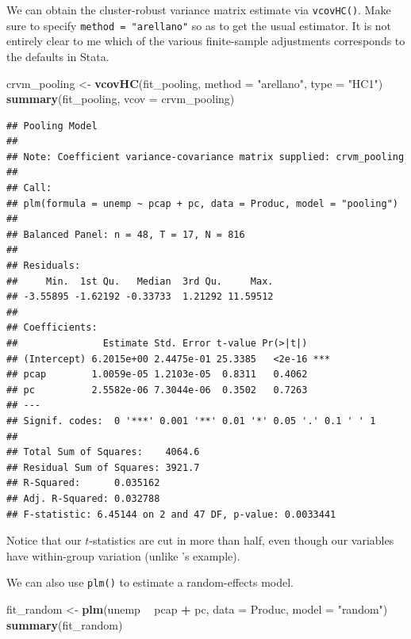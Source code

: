 \documentclass[12pt,oneside,openany]{book}
\newenvironment{Shaded}{\begin{snugshade}}{\end{snugshade}}
\newcommand{\KeywordTok}[1]{\textcolor[rgb]{0.13,0.29,0.53}{\textbf{#1}}}
\newcommand{\DataTypeTok}[1]{\textcolor[rgb]{0.13,0.29,0.53}{#1}}
\newcommand{\StringTok}[1]{\textcolor[rgb]{0.31,0.60,0.02}{#1}}
\newcommand{\OperatorTok}[1]{\textcolor[rgb]{0.81,0.36,0.00}{\textbf{#1}}}
\newcommand{\NormalTok}[1]{#1}
\begin{document}
We can obtain the cluster-robust variance matrix estimate via
\texttt{vcovHC()}. Make sure to specify \texttt{method\ =\ "arellano"}
so as to get the usual estimator. It is not entirely clear to me which
of the various finite-sample adjustments corresponds to the defaults in
Stata.

\begin{Shaded}
\begin{Highlighting}[]
\NormalTok{crvm_pooling <-}\StringTok{ }\KeywordTok{vcovHC}\NormalTok{(fit_pooling,}
                       \DataTypeTok{method =} \StringTok{"arellano"}\NormalTok{,}
                       \DataTypeTok{type =} \StringTok{"HC1"}\NormalTok{)}
\KeywordTok{summary}\NormalTok{(fit_pooling, }\DataTypeTok{vcov =}\NormalTok{ crvm_pooling)}
\end{Highlighting}
\end{Shaded}

\begin{verbatim}
## Pooling Model
## 
## Note: Coefficient variance-covariance matrix supplied: crvm_pooling
## 
## Call:
## plm(formula = unemp ~ pcap + pc, data = Produc, model = "pooling")
## 
## Balanced Panel: n = 48, T = 17, N = 816
## 
## Residuals:
##     Min.  1st Qu.   Median  3rd Qu.     Max. 
## -3.55895 -1.62192 -0.33733  1.21292 11.59512 
## 
## Coefficients:
##               Estimate Std. Error t-value Pr(>|t|)    
## (Intercept) 6.2015e+00 2.4475e-01 25.3385   <2e-16 ***
## pcap        1.0059e-05 1.2103e-05  0.8311   0.4062    
## pc          2.5582e-06 7.3044e-06  0.3502   0.7263    
## ---
## Signif. codes:  0 '***' 0.001 '**' 0.01 '*' 0.05 '.' 0.1 ' ' 1
## 
## Total Sum of Squares:    4064.6
## Residual Sum of Squares: 3921.7
## R-Squared:      0.035162
## Adj. R-Squared: 0.032788
## F-statistic: 6.45144 on 2 and 47 DF, p-value: 0.0033441
\end{verbatim}

Notice that our \(t\)-statistics are cut in more than half, even though
our variables have within-group variation (unlike
\citet{Moulton:1990bl}'s example).

We can also use \texttt{plm()} to estimate a random-effects model.

\begin{Shaded}
\begin{Highlighting}[]
\NormalTok{fit_random <-}\StringTok{ }\KeywordTok{plm}\NormalTok{(unemp }\OperatorTok{~}\StringTok{ }\NormalTok{pcap }\OperatorTok{+}\StringTok{ }\NormalTok{pc,}
                  \DataTypeTok{data =}\NormalTok{ Produc,}
                  \DataTypeTok{model =} \StringTok{"random"}\NormalTok{)}
\KeywordTok{summary}\NormalTok{(fit_random)}
\end{Highlighting}
\end{Shaded}
\end{document}
